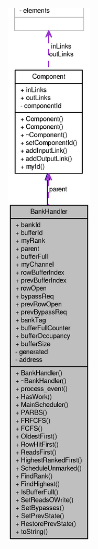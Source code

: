 \begin{figure}[H]
\begin{center}
\leavevmode
\includegraphics[height=400pt]{classBankHandler__coll__graph}
\end{center}
\end{figure}

